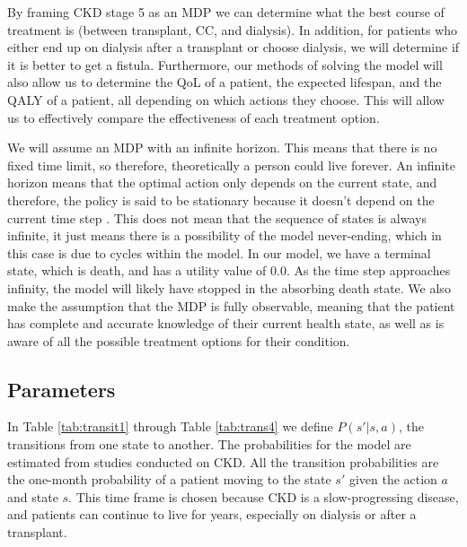 \documentclass[10pt,twocolumn]{article}
\begin{document}
By framing CKD stage 5 as an MDP we can determine what the best course of treatment is (between transplant, CC, and dialysis). In addition, for patients who either end up on dialysis after a transplant or choose dialysis, we will determine if it is better to get a fistula. Furthermore, our methods of solving the model will also allow us to determine the QoL of a patient, the expected lifespan, and the QALY of a patient, all depending on which actions they choose. This will allow us to effectively compare the effectiveness of each treatment option.

We will assume an MDP with an infinite horizon. This means that there is no fixed time limit, so therefore, theoretically a person could live forever. An infinite horizon means that the optimal action only depends on the current state, and therefore, the policy is said to be stationary because it doesn't depend on the current time step \cite{ai}. This does not mean that the sequence of states is always infinite, it just means there is a possibility of the model never-ending, which in this case is due to cycles within the model. In our model, we have a terminal state, which is death, and has a utility value of 0.0. As the time step approaches infinity, the model will likely have stopped in the absorbing death state. We also make the assumption that the MDP is fully observable, meaning that the patient has complete and accurate knowledge of their current health state, as well as is aware of all the possible treatment options for their condition.

\subsection{Parameters}
In Table \ref{tab:transit1} through Table \ref{tab:trans4} we define \(P(s' | s, a)\), the transitions from one state to another. The probabilities for the model are estimated from studies conducted on CKD. All the transition probabilities are the one-month probability of a patient moving to the state \(s'\) given the action \(a\) and state \(s\). This time frame is chosen because CKD is a slow-progressing disease, and patients can continue to live for years, especially on dialysis or after a transplant.
\end{document}
